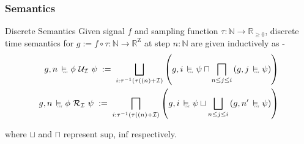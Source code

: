 \documentclass{beamer}
\newcommand{\typeTime}{\mathbb{R}_{\geq 0}}
\newcommand{\typeReal}{\mathbb{R}}
\newcommand{\typeNat}{\mathbb{N}}
\newcommand{\until}{\mathcal{U}}
\newcommand{\release}{\mathcal{R}}
\newcommand{\interval}{\mathcal{I}}
\newcommand{\Z}{\text{Z}}
\newcommand{\cont}{\raisebox{-0.1ex}{\scalebox{0.25}{\textrm{CNT}}}}
\newcommand{\contSatisfy}{\ \stackMath\stackunder[0pt]{\vDash}{\hspace*{0.3em}\cont}\ }
\newcommand{\robustAssign}{\; := \;}
\begin{document}
\begin{frame}
    \frametitle{Semantics}
    \begin{block}{Discrete Semantics}
        Given signal $f$ and sampling function $\tau : \typeNat
        \to \typeTime$, discrete time semantics for $g := f \circ \tau : \typeNat
        \to  \typeReal^{\Z}$ at step $n:\typeNat$ are given inductively as -
        \begin{align*}
            g, n \contSatisfy \phi\ \until_{\interval}\ \psi
            \robustAssign \bigsqcup_{i: \tau^{-1}(\tau((n) +\interval)}\left( g, i \contSatisfy \psi
           \sqcap \bigsqcap_{n \leq j \leq i} \left( g, j \contSatisfy \psi
            \right ) \right) \\
            g, n \contSatisfy \phi\ \release_{\interval}\ \psi
           \robustAssign \bigsqcap_{i: \tau^{-1}(\tau((n) +\interval)} \left( g, i \contSatisfy \psi
           \sqcup \bigsqcup_{n \leq j \leq i} \left( g, n' \contSatisfy \psi
            \right ) \right)
        \end{align*}
    \end{block}
    where $\sqcup$ and $\sqcap$ represent $\text{sup}$, $\text{inf}$ respectively.
\end{frame}
\end{document}
